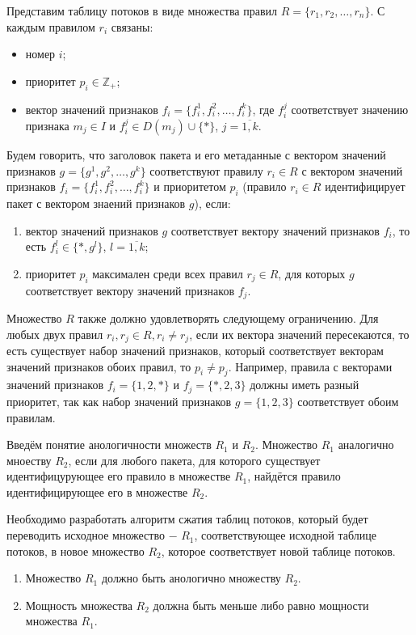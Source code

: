 \documentclass[a4peper, 12pt, titlepage, finall]{extreport}
\begin{document}
        Представим таблицу потоков в виде множества правил \(R=\{r_1,r_2,\ldots,r_n\}\). С каждым правилом \(r_i\) связаны:
        \begin{itemize}
            \item номер \(i\);
            \item приоритет \(p_i\in \mathbb{Z_+}\);
            \item вектор значений признаков \(f_i=\{f_i^1,f_i^2,\ldots,f_i^k\}\), где \(f_i^j\) соответствует значению признака \(m_j\in I\) и \(f_i^j\in D(m_j)\cup\{*\}\), \(j=\overline{1,k}\).
        \end{itemize}

        Будем говорить, что заголовок пакета и его метаданные с вектором значений признаков \(g=\{g^1,g^2,\ldots,g^k\}\) 
        соответствуют правилу \(r_i\in R\) с вектором значений признаков \(f_i=\{f_i^1,f_i^2,\ldots,f_i^k\}\) 
        и приоритетом \(p_i\) (правило \(r_i\in R\) идентифицирует пакет с вектором знаений признаков \(g\)), если:

        \begin{enumerate}
            \item вектор значений признаков \(g\) соответствует вектору значений признаков \(f_i\), то есть \(f_i^l\in\{*,g^l\}\), \(l=\overline{1,k}\);
            \item приоритет \(p_i\) максимален среди всех правил \(r_j\in R\), для которых \(g\) соответствует вектору значений признаков \(f_j\).
        \end{enumerate}

        Множество \(R\) также должно удовлетворять следующему ограничению. 
        Для любых двух правил \(r_i,r_j\in R,r_i\not= r_j\), если их вектора значений пересекаются, то есть существует набор значений признаков, 
        который соответствует векторам значений признаков обоих правил, то \(p_i\not= p_j\). 
        Например, правила с векторами значений признаков \(f_i=\{1, 2, *\}\) и \(f_j=\{*, 2, 3\}\) должны иметь разный приоритет, 
        так как набор значений признаков \(g=\{1, 2, 3\}\) соответствует обоим правилам.

        Введём понятие анологичности множеств \(R_1\) и \(R_2\).
        Множество \(R_1\) аналогично мноеству \(R_2\), если для любого пакета, для которого существует идентифицурующее его правило в множестве \(R_1\), 
        найдётся правило идентифицирующее его в множестве \(R_2\).

        Необходимо разработать алгоритм сжатия таблиц потоков, который будет переводить исходное множество $-$ \(R_1\), соответствующее исходной таблице потоков, в
        новое множество \(R_2\), которое соответствует новой таблице потоков.
        \begin{enumerate}
            \item Множество \(R_1\) должно быть анологично множеству \(R_2\).
            \item Мощность множества \(R_2\) должна быть меньше либо равно мощности множества \(R_1\).
        \end{enumerate}
    \begingroup
    \let\clearpage\relax
    \printbibliography
    \endgroup
\end{document}
